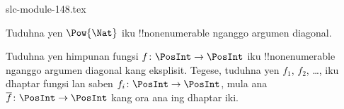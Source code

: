 \begin{filecontents*}[overwrite]{slc-module-148.tex}
\begin{prob}
Tuduhna yen $\Pow{\Nat}$ iku !!{nonenumerable} nganggo argumen diagonal.
\end{prob}

\begin{prob}\label{sfr:siz:nen:prob:f-posint}
Tuduhna yen himpunan fungsi $f \colon \PosInt \to \PosInt$ iku
!!{nonenumerable} nganggo argumen diagonal kang eksplisit. Tegese,
tuduhna yen $f_1$, $f_2$, \dots, iku dhaptar fungsi lan saben $f_i\colon
\PosInt \to \PosInt$, mula ana $\overline{f}\colon \PosInt \to
\PosInt$ kang ora ana ing dhaptar iki.
\end{prob}


\end{filecontents*}

